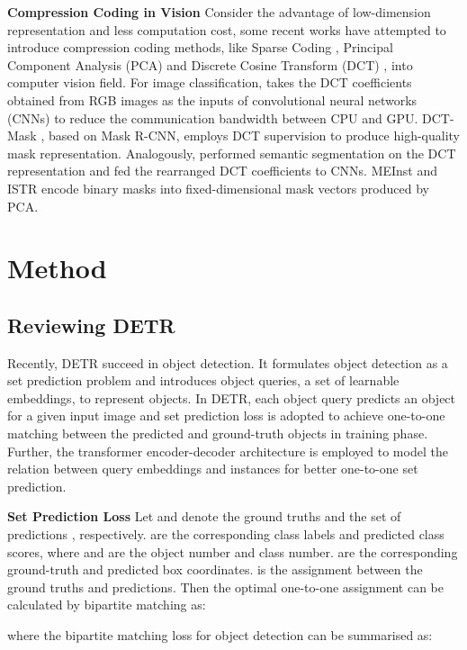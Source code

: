 \documentclass{article}
\begin{document}
\textbf{Compression Coding in Vision}
Consider the advantage of low-dimension representation and less computation cost, some recent works have attempted to introduce compression coding methods, like Sparse Coding \cite{donoho2006compressed}, Principal Component Analysis (PCA) \cite{wold1987principal} and Discrete Cosine Transform (DCT) \cite{ahmed1974discrete}, into computer vision field. For image classification, \cite{xu2020learn_in_freq} takes the DCT coefficients obtained from RGB images as the inputs of convolutional neural networks (CNNs) to reduce the communication bandwidth between CPU and GPU. DCT-Mask \cite{shen2020dct},  based on Mask R-CNN, employs DCT supervision to produce high-quality mask representation. Analogously, \cite{lo2019exploring} performed semantic segmentation on the DCT representation and fed the rearranged DCT coefficients to CNNs. MEInst \cite{zhang2020meinst} and ISTR \cite{hu2021istr} encode binary masks into fixed-dimensional mask vectors produced by PCA.

\section{Method}
\subsection{Reviewing DETR}
Recently, DETR \cite{carion2020detr} succeed in object detection. It formulates object detection as a set prediction problem and introduces object queries, a set of learnable embeddings, to represent objects. In DETR, each object query predicts an object for a given input image and set prediction loss is adopted to achieve one-to-one matching between the predicted and ground-truth objects in training phase. Further, the transformer encoder-decoder architecture is employed to model the relation between query embeddings and instances for better one-to-one set prediction.

\textbf{Set Prediction Loss}
Let  and  denote the ground truths  and the set of predictions , respectively.  are the corresponding class labels and predicted class scores, where  and  are the object number and class number.  are the corresponding ground-truth and predicted box coordinates.  is the assignment between the ground truths and predictions. Then the optimal one-to-one assignment  can be calculated by bipartite matching \cite{kuhn1955hungarian} as:

where the bipartite matching loss for object detection  can be summarised as:
\end{document}
